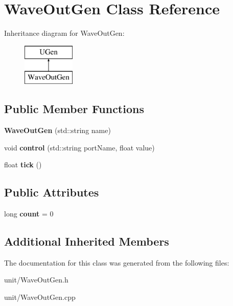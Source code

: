 \hypertarget{classWaveOutGen}{}\section{Wave\+Out\+Gen Class Reference}
\label{classWaveOutGen}
Inheritance diagram for Wave\+Out\+Gen\+:\begin{figure}[H]
\begin{center}
\leavevmode
\includegraphics[height=2.000000cm]{classWaveOutGen}
\end{center}
\end{figure}
\subsection*{Public Member Functions}
\begin{DoxyCompactItemize}
\item 
{\bfseries Wave\+Out\+Gen} (std\+::string name)\hypertarget{classWaveOutGen_af7b0343212eb3de1ed4ef2dad90ad43e}{}\label{classWaveOutGen_af7b0343212eb3de1ed4ef2dad90ad43e}

\item 
void {\bfseries control} (std\+::string port\+Name, float value)\hypertarget{classWaveOutGen_a919d71ae0729553b3bd1799add9d1088}{}\label{classWaveOutGen_a919d71ae0729553b3bd1799add9d1088}

\item 
float {\bfseries tick} ()\hypertarget{classWaveOutGen_a468581d97aaf471e6516aee2cdb630cd}{}\label{classWaveOutGen_a468581d97aaf471e6516aee2cdb630cd}

\end{DoxyCompactItemize}
\subsection*{Public Attributes}
\begin{DoxyCompactItemize}
\item 
long {\bfseries count} = 0\hypertarget{classWaveOutGen_aa715f14677edeb7ceed397b1624b6b19}{}\label{classWaveOutGen_aa715f14677edeb7ceed397b1624b6b19}

\end{DoxyCompactItemize}
\subsection*{Additional Inherited Members}


The documentation for this class was generated from the following files\+:\begin{DoxyCompactItemize}
\item 
unit/Wave\+Out\+Gen.\+h\item 
unit/Wave\+Out\+Gen.\+cpp\end{DoxyCompactItemize}
